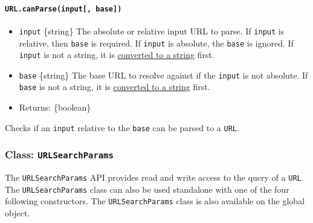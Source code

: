 \paragraph{\texorpdfstring{\texttt{URL.canParse(input{[},\ base{]})}}{URL.canParse(input{[}, base{]})}}\label{url.canparseinput-base}

\begin{itemize}
\tightlist
\item
  \texttt{input} \{string\} The absolute or relative input URL to parse.
  If \texttt{input} is relative, then \texttt{base} is required. If
  \texttt{input} is absolute, the \texttt{base} is ignored. If
  \texttt{input} is not a string, it is
  \href{https://tc39.es/ecma262/\#sec-tostring}{converted to a string}
  first.
\item
  \texttt{base} \{string\} The base URL to resolve against if the
  \texttt{input} is not absolute. If \texttt{base} is not a string, it
  is \href{https://tc39.es/ecma262/\#sec-tostring}{converted to a
  string} first.
\item
  Returns: \{boolean\}
\end{itemize}

Checks if an \texttt{input} relative to the \texttt{base} can be parsed
to a \texttt{URL}.

\begin{Shaded}
\begin{Highlighting}[]
\OperatorTok{=}\NormalTok{(}\OperatorTok{,} \NormalTok{)}\OperatorTok{;} 

\OperatorTok{=}\NormalTok{(}\NormalTok{)}\OperatorTok{;} 
\end{Highlighting}
\end{Shaded}

\subsubsection{\texorpdfstring{Class:
\texttt{URLSearchParams}}{Class: URLSearchParams}}\label{class-urlsearchparams}

The \texttt{URLSearchParams} API provides read and write access to the
query of a \texttt{URL}. The \texttt{URLSearchParams} class can also be
used standalone with one of the four following constructors. The
\texttt{URLSearchParams} class is also available on the global object.

